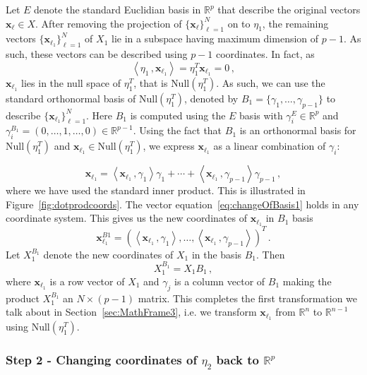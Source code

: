 \documentclass[letter,12pt]{article}
\newcommand{\Null}{\text{Null}}
\begin{document}
{Let $E$ denote the standard Euclidian basis in $\mathbb{R}^p$ that describe the original vectors $\bm{x}_\ell \in X$. After removing the projection of $\{ \bm{x}_\ell\}_{\ell =1}^N$ on to $\eta_1$,  the remaining vectors  $\{\bm{x}_{\ell_1} \}_{\ell=1}^N $ of $X_1$ lie in a  subspace having maximum dimension of $p-1$. As such, these vectors can be described using $p-1$ coordinates. In fact, as 
$$  \left\langle \eta_1 \, ,  \bm{x}_{\ell_1} \right\rangle = \eta_1^T \bm{x}_{\ell_1} = 0 \, ,
$$ 
$\bm{x}_{\ell_1}$ lies in the null space of $\eta_1^T$, that is  $\Null(\eta_1^T)$. As such, we can use the standard orthonormal basis of $\Null(\eta_1^T)$, denoted by $B_1 = \{\gamma_1, \ldots, \gamma_{p-1} \} $ to  describe $\{\bm{x}_{\ell_1} \}_{\ell=1}^N $. Here $B_1$ is computed using the $E$ basis with $\gamma_i^E \in \mathbb{R}^p$ and  $\gamma_i^{B_1} = (0, \ldots, 1, \ldots, 0 ) \in \mathbb{R}^{p-1}$. Using the fact that $B_1$ is an orthonormal basis for $\Null(\eta_1^T)$ and  $\bm{x}_{\ell_1} \in \Null(\eta_1^T)$, we express $\bm{x}_{\ell_1}$ as a linear combination of $\gamma_i$:  

\begin{equation}\label{eq:changeOfBasis1}
    \bm{x}_{\ell_1} = \left\langle \bm{x}_{\ell_1}\, , \gamma_1 \right\rangle \gamma_1 + \cdots + \left\langle \bm{x}_{\ell_1}\, , \gamma_{p-1} \right\rangle \gamma_{p-1} \, , 
\end{equation}
where we have used the standard inner product. This is illustrated in Figure~\ref{fig:dotprodcoords}. The vector equation~\eqref{eq:changeOfBasis1}  holds in any coordinate system. This gives us the new coordinates of $\bm{x}_{\ell_1}$ in $B_1$ basis
$$ \bm{x}_{\ell_1}^{B1}  = \left(\left\langle \bm{x}_{\ell_1}\, , \gamma_1 \right\rangle , \ldots, \left\langle \bm{x}_{\ell_1}\, , \gamma_{p-1} \right\rangle    \right)^T \, .
$$
Let $X_1^{B_1}$ denote the new coordinates of $X_1$ in the basis $B_1$. Then 
$$ X_1^{B_1} = X_1 B_1 \, , 
$$
where $\bm{x}_{\ell_1}$ is a row vector of $X_1$ and $\gamma_j$ is a column vector of $B_1$ making the product $X_1^{B_1}$ an $N \times (p-1)$ matrix. This completes the first transformation we talk about in Section~\ref{sec:MathFrame3}, i.e. we transform $\bm{x}_{\ell_1}$ from $\mathbb{R}^n$ to  $\mathbb{R}^{n-1}$ using $\Null(\eta_1^T)$. 

\subsubsection{Step 2 - Changing coordinates of $\eta_2$ back to $\mathbb{R}^p$ }

}
\end{document}
